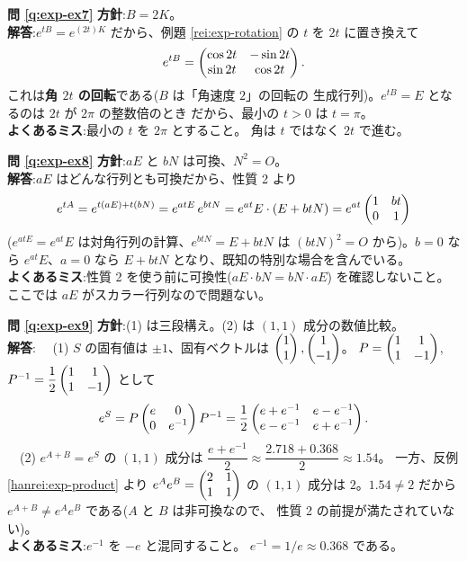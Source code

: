 \bigskip
\noindent\textbf{問 \ref{q:exp-ex7}}\quad
\textbf{方針}:$B = 2K$。\\
\textbf{解答}:$e^{tB} = e^{(2t)K}$ だから、例題 \ref{rei:exp-rotation} の
$t$ を $2t$ に置き換えて
\[
e^{tB} = \begin{pmatrix}\cos 2t & -\sin 2t \\ \sin 2t & \cos 2t\end{pmatrix}.
\]
これは\textbf{角 $2t$ の回転}である($B$ は「角速度 $2$」の回転の
生成行列)。$e^{tB} = E$ となるのは $2t$ が $2\pi$ の整数倍のとき
だから、最小の $t > 0$ は $t = \pi$。\\
\textbf{よくあるミス}:最小の $t$ を $2\pi$ とすること。
角は $t$ ではなく $2t$ で進む。

\bigskip
\noindent\textbf{問 \ref{q:exp-ex8}}\quad
\textbf{方針}:$aE$ と $bN$ は可換、$N^2 = O$。\\
\textbf{解答}:$aE$ はどんな行列とも可換だから、性質 2 より
\[
e^{tA} = e^{t(aE) + t(bN)} = e^{atE}\,e^{btN}
= e^{at}E \cdot (E + btN) = e^{at}\begin{pmatrix}1 & bt \\ 0 & 1\end{pmatrix}
\]
($e^{atE} = e^{at}E$ は対角行列の計算、$e^{btN} = E + btN$ は
$(btN)^2 = O$ から)。$b = 0$ なら $e^{at}E$、$a = 0$ なら
$E + btN$ となり、既知の特別な場合を含んでいる。\\
\textbf{よくあるミス}:性質 2 を使う前に可換性($aE \cdot bN = bN \cdot aE$)
を確認しないこと。ここでは $aE$ がスカラー行列なので問題ない。

\bigskip
\noindent\textbf{問 \ref{q:exp-ex9}}\quad
\textbf{方針}:(1) は三段構え。(2) は $(1,1)$ 成分の数値比較。\\
\textbf{解答}:
　(1) $S$ の固有値は $\pm 1$、固有ベクトルは $\begin{pmatrix}1 \\ 1\end{pmatrix}, \begin{pmatrix}1 \\ -1\end{pmatrix}$。
$P = \begin{pmatrix}1 & 1 \\ 1 & -1\end{pmatrix}$, $P^{-1} = \dfrac{1}{2}\begin{pmatrix}1 & 1 \\ 1 & -1\end{pmatrix}$
として
\[
e^{S} = P\begin{pmatrix}e & 0 \\ 0 & e^{-1}\end{pmatrix}P^{-1}
= \frac{1}{2}\begin{pmatrix}e + e^{-1} & e - e^{-1} \\ e - e^{-1} & e + e^{-1}\end{pmatrix}.
\]
　(2) $e^{A+B} = e^{S}$ の $(1,1)$ 成分は
$\dfrac{e + e^{-1}}{2} \approx \dfrac{2.718 + 0.368}{2} \approx 1.54$。
一方、反例 \ref{hanrei:exp-product} より $e^{A}e^{B} = \begin{pmatrix}2 & 1 \\ 1 & 1\end{pmatrix}$
の $(1,1)$ 成分は $2$。$1.54 \neq 2$ だから
$e^{A+B} \neq e^{A}e^{B}$ である($A$ と $B$ は非可換なので、
性質 2 の前提が満たされていない)。\\
\textbf{よくあるミス}:$e^{-1}$ を $-e$ と混同すること。
$e^{-1} = 1/e \approx 0.368$ である。

